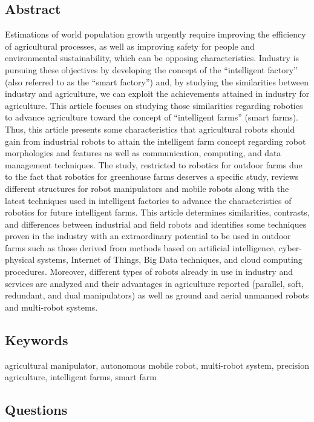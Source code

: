 \documentclass{article}
\begin{document}
\subsection*{Abstract}
Estimations of world population growth urgently require improving the efficiency of
agricultural processes, as well as improving safety for people and environmental sustainability,
which can be opposing characteristics. Industry is pursuing these objectives by developing the
concept of the “intelligent factory” (also referred to as the “smart factory”) and, by studying the
similarities between industry and agriculture, we can exploit the achievements attained in industry
for agriculture. This article focuses on studying those similarities regarding robotics to advance
agriculture toward the concept of “intelligent farms” (smart farms). Thus, this article presents some
characteristics that agricultural robots should gain from industrial robots to attain the intelligent farm
concept regarding robot morphologies and features as well as communication, computing, and data
management techniques. The study, restricted to robotics for outdoor farms due to the fact that robotics
for greenhouse farms deserves a specific study, reviews different structures for robot manipulators and
mobile robots along with the latest techniques used in intelligent factories to advance the characteristics
of robotics for future intelligent farms. This article determines similarities, contrasts, and differences
between industrial and field robots and identifies some techniques proven in the industry with an
extraordinary potential to be used in outdoor farms such as those derived from methods based on
artificial intelligence, cyber-physical systems, Internet of Things, Big Data techniques, and cloud
computing procedures. Moreover, different types of robots already in use in industry and services
are analyzed and their advantages in agriculture reported (parallel, soft, redundant, and dual
manipulators) as well as ground and aerial unmanned robots and multi-robot systems.

\subsection*{Keywords}
agricultural manipulator, autonomous mobile robot, multi-robot system, precision agriculture, intelligent farms, smart farm

\subsection*{Questions}
\end{document}
